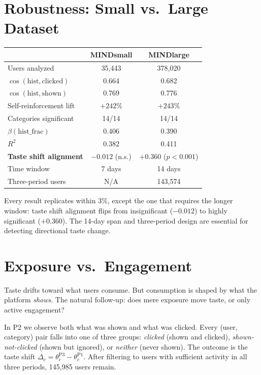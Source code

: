 \documentclass[11pt]{article}
\begin{document}
\section{Robustness: Small vs.\ Large Dataset}

\begin{center}
\begin{tabular}{lcc}
\toprule
& MINDsmall & MINDlarge \\
\midrule
Users analyzed & 35,443 & 378,020 \\
$\cos(\text{hist}, \text{clicked})$ & 0.664 & 0.682 \\
$\cos(\text{hist}, \text{shown})$ & 0.769 & 0.776 \\
Self-reinforcement lift & $+242\%$ & $+243\%$ \\
Categories significant & 14/14 & 14/14 \\
$\beta(\text{hist\_frac})$ & 0.406 & 0.390 \\
$R^2$ & 0.382 & 0.411 \\
\textbf{Taste shift alignment} & $\boldsymbol{-0.012}$ (n.s.) & $\boldsymbol{+0.360}$ ($p < 0.001$) \\
Time window & 7 days & 14 days \\
Three-period users & N/A & 143,574 \\
\bottomrule
\end{tabular}
\end{center}

Every result replicates within 3\%, except the one that requires the longer window: taste shift alignment flips from insignificant ($-0.012$) to highly significant ($+0.360$). The 14-day span and three-period design are essential for detecting directional taste change.


\section{Exposure vs.\ Engagement}
\label{sec:exposure}

Taste drifts toward what users consume. But consumption is shaped by what the platform \emph{shows}. The natural follow-up: does mere exposure move taste, or only active engagement?

In P2 we observe both what was shown and what was clicked. Every (user, category) pair falls into one of three groups: \emph{clicked} (shown and clicked), \emph{shown-not-clicked} (shown but ignored), or \emph{neither} (never shown). The outcome is the taste shift $\Delta_c = \theta_c^{\text{P3}} - \theta_c^{\text{P1}}$. After filtering to users with sufficient activity in all three periods, 145,985 users remain.
\end{document}
